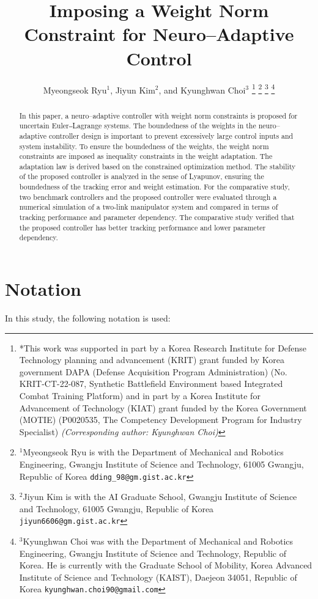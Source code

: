 \documentclass[letterpaper, 10 pt, conference]{ieeeconf}  %
\title{\LARGE \bf
Imposing a Weight Norm Constraint for Neuro–Adaptive Control
}
\author{Myeongseok Ryu$^{1}$, Jiyun Kim$^{2}$, and Kyunghwan Choi$^{3}$%
\thanks{
    *This work was supported in part by a Korea Research Institute for Defense Technology planning and advancement (KRIT) grant funded by Korea government DAPA (Defense Acquisition Program Administration) (No. KRIT-CT-22-087, Synthetic Battlefield Environment based Integrated Combat Training Platform) and in part by a Korea Institute for Advancement of Technology (KIAT) grant funded by the Korea Government (MOTIE) (P0020535, The Competency Development Program for Industry Specialist) \it{(Corresponding author: Kyunghwan Choi)}
}%
\thanks{
    $^{1}$Myeongseok Ryu is with the Department of Mechanical and Robotics Engineering, Gwangju Institute of Science and Technology, 61005 Gwangju, Republic of Korea {\tt\small dding\_98@gm.gist.ac.kr}
}%
\thanks{
    $^{2}$Jiyun Kim is with the AI Graduate School, Gwangju Institute of Science and Technology, 61005 Gwangju, Republic of Korea 
        {\tt\small jiyun6606@gm.gist.ac.kr}
}%
\thanks{
    $^{3}$Kyunghwan Choi was with the Department of Mechanical and Robotics Engineering, Gwangju Institute of Science and Technology, Republic of Korea. He is currently with the Graduate School of Mobility, Korea Advanced Institute of Science and Technology (KAIST), Daejeon 34051, Republic of Korea {\tt\small kyunghwan.choi90@gmail.com}
}%
}
\begin{document}
\maketitle
\thispagestyle{empty}
\pagestyle{empty}

\begin{abstract}

In this paper, a neuro–adaptive controller with weight norm constraints is proposed for uncertain Euler‒Lagrange systems. 
The boundedness of the weights in the neuro–adaptive controller design is important to prevent excessively large control inputs and system instability. 
To ensure the boundedness of the weights, the weight norm constraints are imposed as inequality constraints in the weight adaptation. 
The adaptation law is derived based on the constrained optimization method. 
The stability of the proposed controller is analyzed in the sense of Lyapunov, ensuring the boundedness of the tracking error and weight estimation. 
For the comparative study, two benchmark controllers and the proposed controller were evaluated through a numerical simulation of a two-link manipulator system and compared in terms of tracking performance and parameter dependency. 
The comparative study verified that the proposed controller has better tracking performance and lower parameter dependency.

\end{abstract}



\section*{Notation}
In this study, the following notation is used:
\end{document}
